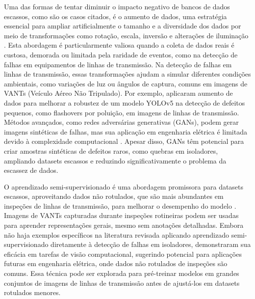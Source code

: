 Uma das formas de tentar diminuir o impacto negativo de bancos de dados escassos, como são os casos citados, é o aumento de dados, uma estratégia essencial para ampliar artificialmente o tamanho e a diversidade dos dados por meio de transformações como rotação, escala, inversão e alterações de iluminação \cite{shorten2019survey}. Esta abordagem é particularmente valiosa quando a coleta de dados reais é custosa, demorada ou limitada pela raridade de eventos, como na detecção de falhas em equipamentos de linhas de transmissão. Na detecção de falhas em linhas de transmissão, essas transformações ajudam a simular diferentes condições ambientais, como variações de luz ou ângulos de captura, comuns em imagens de VANTs (Veículo Aéreo Não Tripulado). Por exemplo,  aplicaram aumento de dados para melhorar a robustez de um modelo YOLOv5 na detecção de defeitos pequenos, como flashovers por poluição, em imagens de linhas de transmissão. Métodos avançados, como redes adversárias generativas (GANs), podem gerar imagens sintéticas de falhas, mas sua aplicação em engenharia elétrica é limitada devido à complexidade computacional \cite{goodfellow2014generative}. Apesar disso, GANs têm potencial para criar amostras sintéticas de defeitos raros, como quebras em isoladores, ampliando datasets escassos e reduzindo significativamente o problema da escassez de dados.

O aprendizado semi-supervisionado é uma abordagem promissora para datasets escassos, aproveitando dados não rotulados, que são mais abundantes em inspeções de linhas de transmissão, para melhorar o desempenho do modelo \cite{van2020survey}. Imagens de VANTs capturadas durante inspeções rotineiras podem ser usadas para aprender representações gerais, mesmo sem anotações detalhadas. Embora não haja exemplos específicos na literatura revisada aplicando aprendizado semi-supervisionado diretamente à detecção de falhas em isoladores,  demonstraram sua eficácia em tarefas de visão computacional, sugerindo potencial para aplicações futuras em engenharia elétrica, onde dados não rotulados de inspeções são comuns. Essa técnica pode ser explorada para pré-treinar modelos em grandes conjuntos de imagens de linhas de transmissão antes de ajustá-los em datasets rotulados menores.

